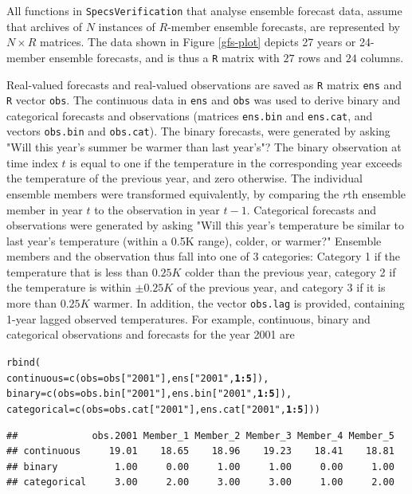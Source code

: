 \documentclass[10pt]{article}\usepackage[]{graphicx}\usepackage[]{color}
\makeatletter
\newcommand{\hlnum}[1]{\textcolor[rgb]{0.502,0,0.502}{\textbf{#1}}}%
\newcommand{\hlstr}[1]{\textcolor[rgb]{0.651,0.522,0}{#1}}%
\newcommand{\hlopt}[1]{\textcolor[rgb]{1,0,0.502}{\textbf{#1}}}%
\newcommand{\hlstd}[1]{\textcolor[rgb]{0,0,0}{#1}}%
\newcommand{\hlkwc}[1]{\textcolor[rgb]{0,0.502,0.753}{#1}}%
\newcommand{\hlkwd}[1]{\textcolor[rgb]{0,0.267,0.4}{#1}}%
\newenvironment{kframe}{%
 \def\at@end@of@kframe{}%
 \ifinner\ifhmode%
  \def\at@end@of@kframe{\end{minipage}}%
  \begin{minipage}{\columnwidth}%
 \fi\fi%
 \def\FrameCommand##1{\hskip\@totalleftmargin \hskip-\fboxsep
 \colorbox{shadecolor}{##1}\hskip-\fboxsep
     \hskip-\linewidth \hskip-\@totalleftmargin \hskip\columnwidth}%
 \MakeFramed {\advance\hsize-\width
   \@totalleftmargin\z@ \linewidth\hsize
   \@setminipage}}%
 {\par\unskip\endMakeFramed%
 \at@end@of@kframe}
\newenvironment{knitrout}{}{} %
\newcommand{\proglang}[1]{\texttt{#1}}
\newcommand{\pkg}[1]{\texttt{#1}}
\newcommand{\code}[1]{\texttt{#1}}
\makeatother
\begin{document}
All functions in \pkg{SpecsVerification} that analyse ensemble forecast data, assume that archives of $N$ instances of $R$-member ensemble forecasts, are represented by $N\times R$ matrices.
The data shown in Figure \ref{gfs-plot} depicts 27 years or 24-member ensemble forecasts, and is thus a \proglang{R} matrix with $27$ rows and $24$ columns.


Real-valued forecasts and real-valued observations are saved as \proglang{R} matrix \code{ens} and \proglang{R} vector \code{obs}. 
The continuous data in \code{ens} and \code{obs} was used to derive binary and categorical forecasts and observations (matrices \code{ens.bin} and \code{ens.cat}, and vectors \code{obs.bin} and \code{obs.cat}).
The binary forecasts, were generated by asking "Will this year's summer be warmer than last year's"?
The binary observation at time index $t$ is equal to one if the temperature in the corresponding year exceeds the temperature of the previous year, and zero otherwise.
The individual ensemble members were transformed equivalently, by comparing the $r$th ensemble member in year $t$ to the observation in year $t-1$.
Categorical forecasts and observations were generated by asking "Will this year's temperature be similar to last year's temperature (within a 0.5K range), colder, or warmer?"
Ensemble members and the observation thus fall into one of 3 categories: Category 1 if the temperature that is less than $0.25K$ colder than the previous year, category 2 if the temperature is within $\pm 0.25K$ of the previous year, and category 3 if it is more than $0.25K$ warmer.
In addition, the vector \code{obs.lag} is provided, containing 1-year lagged observed temperatures.
For example, continuous, binary and categorical observations and forecasts for the year 2001 are 

\begin{knitrout}
\color{fgcolor}\begin{kframe}
\begin{alltt}
\hlkwd{rbind}\hlstd{(}
\hlkwc{continuous} \hlstd{=} \hlkwd{c}\hlstd{(}\hlkwc{obs}\hlstd{=obs[}\hlstr{"2001"}\hlstd{], ens[}\hlstr{"2001"}\hlstd{,} \hlnum{1}\hlopt{:}\hlnum{5}\hlstd{]),}
\hlkwc{binary}     \hlstd{=} \hlkwd{c}\hlstd{(}\hlkwc{obs}\hlstd{=obs.bin[}\hlstr{"2001"}\hlstd{], ens.bin[}\hlstr{"2001"}\hlstd{,} \hlnum{1}\hlopt{:}\hlnum{5}\hlstd{]),}
\hlkwc{categorical} \hlstd{=} \hlkwd{c}\hlstd{(}\hlkwc{obs}\hlstd{=obs.cat[}\hlstr{"2001"}\hlstd{], ens.cat[}\hlstr{"2001"}\hlstd{,} \hlnum{1}\hlopt{:}\hlnum{5}\hlstd{]))}
\end{alltt}
\begin{verbatim}
##             obs.2001 Member_1 Member_2 Member_3 Member_4 Member_5
## continuous     19.01    18.65    18.96    19.23    18.41    18.81
## binary          1.00     0.00     1.00     1.00     0.00     1.00
## categorical     3.00     2.00     3.00     3.00     1.00     2.00
\end{verbatim}
\end{kframe}
\end{knitrout}
\end{document}
